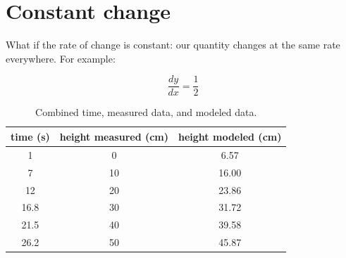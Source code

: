 \documentclass[11pt,fleqn]{book}
\begin{document}
	\section{Constant change}
	
	What if the rate of change is constant: our quantity changes at the same rate everywhere. For example:
	
	\begin{equation}
		\frac{dy}{dx} = \frac{1}{2}
	\end{equation}


	\begin{table}[h!]
		\label{table:filling_data}
		\centering
		\begin{tabular}{||c | c | c||} 
			\hline
			time (s) & height measured (cm) & height modeled (cm)\\ [0.5ex] 
			\hline\hline
			1	& 0 & 6.57 \\
			7	& 10 & 16.00 \\
			12	& 20 & 23.86 \\
			16.8	& 30 & 31.72 \\
			21.5	& 40 & 39.58 \\
			26.2	& 50 & 45.87 \\ [1ex] 
			\hline
		\end{tabular}
		\caption{Combined time, measured data, and modeled data.}
	\end{table}

	

 
\end{document}
